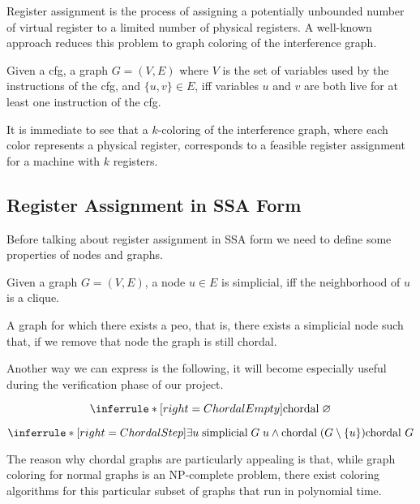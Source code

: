 Register assignment is the process of assigning a potentially unbounded number of virtual register to a limited number of physical registers. A well-known approach reduces this problem to graph coloring of the interference graph.

\begin{definition}\label{def:ig}
    Given a \gls{cfg}, a graph $G = (V, E)$ where $V$ is the set of variables used by the instructions of the \gls{cfg}, and $\{ u, v \} \in E$, iff variables $u$ and $v$ are both live for at least one instruction of the \gls{cfg}.
\end{definition}

It is immediate to see that a $k$-coloring of the interference graph, where each color represents a physical register, corresponds to a feasible register assignment for a machine with $k$ registers.

\subsection{Register Assignment in SSA Form}
\label{subsec:ssara}

Before talking about register assignment in SSA form we need to define some properties of nodes and graphs.

\begin{definition}\label{def:simplicial}
    Given a graph $G = (V, E)$, a node $u \in E$ is simplicial, iff the neighborhood of $u$ is a clique.
\end{definition}

\begin{definition}\label{def:chordal}
    A graph for which there exists a \gls{peo}, that is, there exists a simplicial node such that, if we remove that node the graph is still chordal.
\end{definition}

Another way we can express  is the following, it will become especially useful during the verification phase of our project.

\[
\inferrule*[right=ChordalEmpty]{
}{
    \text{chordal} \; \varnothing
}
\]

\[
\inferrule*[right=ChordalStep]{
    \exists u \; \text{simplicial} \; G \; u \land
    \text{chordal} \; (G \setminus \{ u \})
}{
    \text{chordal } G
}
\]

The reason why chordal graphs are particularly appealing is that, while graph coloring for normal graphs is an NP-complete problem, there exist coloring algorithms for this particular subset of graphs that run in polynomial time.

